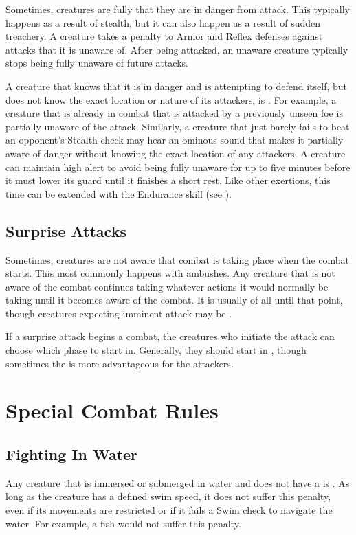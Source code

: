   Sometimes, creatures are fully \unaware that they are in danger from attack.
  This typically happens as a result of stealth, but it can also happen as a result of sudden treachery.
  A creature takes a  penalty to Armor and Reflex defenses against attacks that it is unaware of.
  After being attacked, an unaware creature typically stops being fully unaware of future attacks.

  A creature that knows that it is in danger and is attempting to defend itself, but does not know the exact location or nature of its attackers, is \partiallyunaware.
  For example, a creature that is already in combat that is attacked by a previously unseen foe is partially unaware of the attack.
  Similarly, a creature that just barely fails to beat an opponent's Stealth check may hear an ominous sound that makes it partially aware of danger without knowing the exact location of any attackers.
  A creature can maintain high alert to avoid being fully unaware for up to five minutes before it must lower its guard until it finishes a short rest.
  Like other exertions, this time can be extended with the Endurance skill (see ).

  \subsection{Surprise Attacks}\label{Surprise Attacks}
    Sometimes, creatures are not aware that combat is taking place when the combat starts.
    This most commonly happens with ambushes.
    Any creature that is not aware of the combat continues taking whatever actions it would normally be taking until it becomes aware of the combat.
    It is usually \unaware of all until that point, though creatures expecting imminent attack may be \partiallyunaware.

    If a surprise attack begins a combat, the creatures who initiate the attack can choose which phase to start in.
    Generally, they should start in , though sometimes the  is more advantageous for the attackers.

\section{Special Combat Rules}

  \subsection{Fighting In Water}\label{Fighting In Water}
    Any creature that is immersed or submerged in water and does not have a  is \unsteady.
    As long as the creature has a defined swim speed, it does not suffer this penalty, even if its movements are restricted or if it fails a Swim check to navigate the water.
    For example, a \grappled fish would not suffer this penalty.

